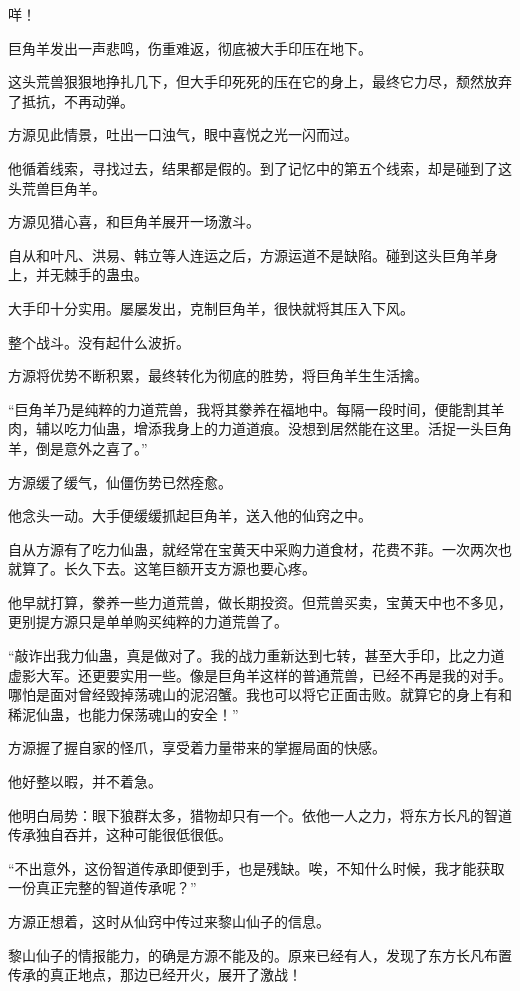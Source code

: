 \begin{this_body}
咩！

巨角羊发出一声悲鸣，伤重难返，彻底被大手印压在地下。

这头荒兽狠狠地挣扎几下，但大手印死死的压在它的身上，最终它力尽，颓然放弃了抵抗，不再动弹。

方源见此情景，吐出一口浊气，眼中喜悦之光一闪而过。

他循着线索，寻找过去，结果都是假的。到了记忆中的第五个线索，却是碰到了这头荒兽巨角羊。

方源见猎心喜，和巨角羊展开一场激斗。

自从和叶凡、洪易、韩立等人连运之后，方源运道不是缺陷。碰到这头巨角羊身上，并无棘手的蛊虫。

大手印十分实用。屡屡发出，克制巨角羊，很快就将其压入下风。

整个战斗。没有起什么波折。

方源将优势不断积累，最终转化为彻底的胜势，将巨角羊生生活擒。

“巨角羊乃是纯粹的力道荒兽，我将其豢养在福地中。每隔一段时间，便能割其羊肉，辅以吃力仙蛊，增添我身上的力道道痕。没想到居然能在这里。活捉一头巨角羊，倒是意外之喜了。”

方源缓了缓气，仙僵伤势已然痊愈。

他念头一动。大手便缓缓抓起巨角羊，送入他的仙窍之中。

自从方源有了吃力仙蛊，就经常在宝黄天中采购力道食材，花费不菲。一次两次也就算了。长久下去。这笔巨额开支方源也要心疼。

他早就打算，豢养一些力道荒兽，做长期投资。但荒兽买卖，宝黄天中也不多见，更别提方源只是单单购买纯粹的力道荒兽了。

“敲诈出我力仙蛊，真是做对了。我的战力重新达到七转，甚至大手印，比之力道虚影大军。还更要实用一些。像是巨角羊这样的普通荒兽，已经不再是我的对手。哪怕是面对曾经毁掉荡魂山的泥沼蟹。我也可以将它正面击败。就算它的身上有和稀泥仙蛊，也能力保荡魂山的安全！”

方源握了握自家的怪爪，享受着力量带来的掌握局面的快感。

他好整以暇，并不着急。

他明白局势：眼下狼群太多，猎物却只有一个。依他一人之力，将东方长凡的智道传承独自吞并，这种可能很低很低。

“不出意外，这份智道传承即便到手，也是残缺。唉，不知什么时候，我才能获取一份真正完整的智道传承呢？”

方源正想着，这时从仙窍中传过来黎山仙子的信息。

黎山仙子的情报能力，的确是方源不能及的。原来已经有人，发现了东方长凡布置传承的真正地点，那边已经开火，展开了激战！


\end{this_body}

